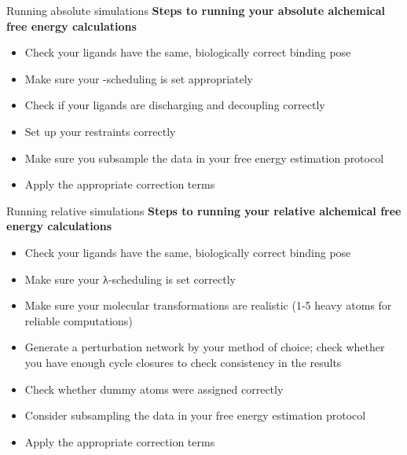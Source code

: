 \documentclass[9pt,bestpractices]{livecoms}
\begin{document}
\begin{Checklists*}
\begin{checklist}{Running absolute simulations}
        \textbf{Steps to running your absolute alchemical free energy calculations}
\begin{itemize}
 \item Check your ligands have the same, biologically correct binding pose
        \item Make sure your \textlambda-scheduling is set appropriately
        \item Check if your ligands are discharging and decoupling correctly
        \item Set up your restraints correctly
        \item Make sure you subsample the data in your free energy estimation protocol
        \item Apply the appropriate correction terms
\end{itemize}
\end{checklist}

\begin{checklist}{Running relative simulations}
        \textbf{Steps to running your relative alchemical free energy calculations}
\begin{itemize}
   \item Check your ligands  have the same, biologically correct binding pose
        \item Make sure your λ-scheduling is set correctly
        \item Make sure your molecular transformations are realistic (1-5 heavy atoms for reliable computations)
        \item Generate a perturbation network by your method of choice; check whether you have enough cycle closures to check consistency in the results
        \item Check whether dummy atoms were assigned correctly
        \item Consider subsampling the data in your free energy estimation protocol
        \item Apply the 
        appropriate correction terms
\end{itemize}
\end{checklist}
\end{Checklists*}
\end{document}
